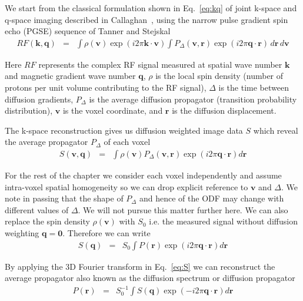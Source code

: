 \documentclass{bioinfo}
\begin{document}
We start from the classical formulation shown in Eq.~\ref{eq:kq}
of joint k-space and q-space imaging described in Callaghan~\cite{Callaghan1991OUP},
\cite{callaghan1988nmr} using the narrow pulse gradient spin echo
(PGSE) sequence of Tanner and Stejskal \begin{eqnarray}
RF(\mathbf{k},\mathbf{q}) & = & \int\rho(\mathbf{v})\exp(i2\pi\mathbf{k}\cdot\mathbf{v})\int P_{\Delta}(\mathbf{v},\mathbf{r})\exp(i2\pi\mathbf{q}\cdot\mathbf{r})\, d\mathbf{r\,}d\mathbf{v}\label{eq:kq}\end{eqnarray}


\noindent Here $RF$ represents the complex RF signal measured at
spatial wave number $\mathbf{k}$ and magnetic gradient wave number
$\mathbf{q}$, $\rho$ is the local spin density (number of protons
per unit volume contributing to the RF signal), $\Delta$ is the time
between diffusion gradients, $P_{\Delta}$ is the average diffusion
propagator (transition probability distribution), \textbf{$\mathbf{v}$}
is the voxel coordinate, and $\mathbf{r}$ is the diffusion displacement. 

The k-space reconstruction gives us diffusion weighted image data
$S$ which reveal the average propagator $P_{\Delta}$ of each voxel
\begin{eqnarray}
S(\mathbf{v},\mathbf{q}) & = & \int\rho(\mathbf{v})P_{\Delta}(\mathbf{v},\mathbf{r})\exp(i2\pi\mathbf{q}\cdot\mathbf{r})d\mathbf{r}\label{eq:W}\end{eqnarray}


For the rest of the chapter we consider each voxel independently and
assume intra-voxel spatial homogeneity so we can drop explicit reference
to $\mathbf{v}$ and $\Delta$. We note in passing that the shape
of $P_{\Delta}$ and hence of the ODF may change with different values
of $\Delta$. We will not pursue this matter further here. We can
also replace the spin density \foreignlanguage{british}{$\rho(\mathbf{v})$}
with $S_{0}$ i.e. the measured signal without diffusion weighting
$\mathbf{q}=\mathbf{0}$. Therefore we can write\begin{eqnarray}
S(\mathbf{q}) & = & S_{0}\int P(\mathbf{r})\exp(i2\pi\mathbf{q}\cdot\mathbf{r})d\mathbf{r}\label{eq:S}\end{eqnarray}


By applying the 3D Fourier transform in Eq.~\ref{eq:S} we can reconstruct
the average propagator also known as the diffusion spectrum \cite{Wedeen}
or diffusion propagator\begin{eqnarray}
P(\mathbf{r}) & = & S_{0}^{-1}\int S(\mathbf{q})\exp(-i2\pi\mathbf{q}\cdot\mathbf{r})d\mathbf{r}\label{eq:P}\end{eqnarray}
\end{document}
